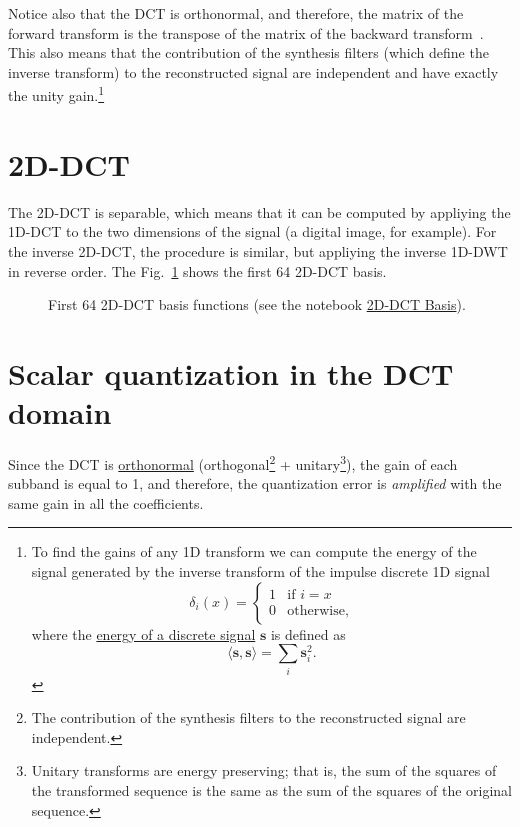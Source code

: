 Notice also that the DCT is orthonormal, and therefore, the matrix of
the forward transform is the transpose of the matrix of the backward
transform~\cite{sayood2017introduction}. This also means that the
contribution of the synthesis filters (which define the inverse
transform) to the reconstructed signal are independent and have
exactly the unity gain.\footnote{To find the gains of any 1D transform
we can compute the energy of the signal generated by the inverse
transform of the impulse discrete 1D signal
\begin{equation}
  \delta_{i}(x) = 
  \left\{
  \begin{array}{ll}
    1 & \text{if $i=x$}\\
    0 & \text{otherwise},
  \end{array}
  \right.
\end{equation}
where the
\href{https://en.wikipedia.org/wiki/Energy_(signal_processing)}{energy
  of a discrete signal} ${\mathbf s}$ is defined as
\begin{equation}
  \langle {\mathbf s}, {\mathbf s} \rangle =  \sum_{i}{{\mathbf s}_i^2}.
\end{equation}
}

\section{2D-DCT}

The 2D-DCT is separable, which means that it can be computed by
appliying the 1D-DCT to the two dimensions of the signal (a digital
image, for example). For the inverse 2D-DCT, the procedure is similar,
but appliying the inverse 1D-DWT in reverse order. The
Fig.~\ref{fig:2D-DCT_basis} shows the first 64 2D-DCT basis.

\begin{figure}
  \centering {} \caption{First 64 2D-DCT basis
  functions (see the notebook
\href{https://github.com/vicente-gonzalez-ruiz/DCT/blob/master/docs/HTML/graphics/2D-DCT_basis.ipynb}{2D-DCT Basis}).}
  \label{fig:2D-DCT_basis}
\end{figure}

\section{Scalar quantization in the DCT domain}

Since the DCT is
\href{https://en.wikipedia.org/wiki/Orthonormality}{orthonormal}
(orthogonal\footnote{The contribution of the synthesis filters to the
reconstructed signal are independent.} + unitary\footnote{Unitary
transforms are energy preserving; that is, the sum of the squares of
the transformed sequence is the same as the sum of the squares of the
original sequence.}), the gain of each subband is equal to 1, and
therefore, the quantization error is \emph{amplified} with the same
gain in all the coefficients.

